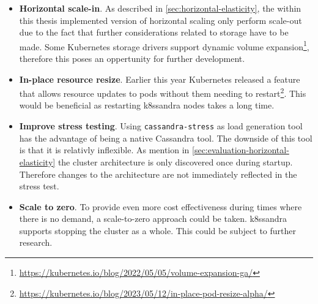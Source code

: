 \begin{itemize}
    \item \textbf{Horizontal scale-in}. As described in \cref{sec:horizontal-elasticity}, the within this thesis implemented version of horizontal scaling only perform scale-out due to the fact that further considerations related to storage have to be made. Some Kubernetes storage drivers support dynamic volume expansion\footnote{\url{https://kubernetes.io/blog/2022/05/05/volume-expansion-ga/}}, therefore this poses an oppertunity for further development.

    \item \textbf{In-place resource resize}. Earlier this year Kubernetes released a feature that allows resource updates to pods without them needing to restart\footnote{\url{https://kubernetes.io/blog/2023/05/12/in-place-pod-resize-alpha/}}. This would be beneficial as restarting k8ssandra nodes takes a long time.

    \item \textbf{Improve stress testing}. Using \texttt{cassandra-stress} as load generation tool has the advantage of being a native Cassandra tool. The downside of this tool is that it is relativly inflexible. As mention in \cref{sec:evaluation-horizontal-elasticity} the cluster architecture is only discovered once during startup. Therefore changes to the architecture are not immediately reflected in the stress test.

    \item \textbf{Scale to zero}. To provide even more cost effectiveness during times where there is no demand, a scale-to-zero approach could be taken. k8ssandra supports stopping the cluster as a whole. This could be subject to further research.
\end{itemize}
